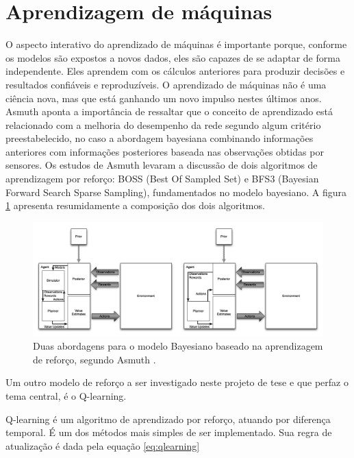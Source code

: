 \section{Aprendizagem de máquinas}
O aspecto interativo do aprendizado de máquinas é importante porque, conforme os modelos são expostos a novos dados, eles são capazes de se adaptar de forma independente. Eles aprendem com os cálculos anteriores para produzir decisões e resultados confiáveis e reproduzíveis. O aprendizado de máquinas não é uma ciência nova, mas que está ganhando um novo impulso nestes últimos anos. Asmuth \cite{asm:13} aponta a importância de ressaltar que o conceito de aprendizado está relacionado com a melhoria do desempenho da rede segundo algum critério preestabelecido, no caso a abordagem bayesiana combinando informações anteriores com informações posteriores baseada nas observações obtidas por sensores. Os estudos de Asmuth \cite{asm:13} levaram a discussão de dois algoritmos de aprendizagem por reforço: BOSS (Best Of Sampled Set) e BFS3 (Bayesian Forward Search Sparse Sampling), fundamentados no modelo bayesiano. A figura \ref{asmuth} apresenta resumidamente a composição dos dois algoritmos.
\begin{figure} [h!]												%
	\centering													%
	\includegraphics[width=1.0\textwidth]{./asmuth}				%
	\caption{Duas abordagens para o modelo Bayesiano baseado na aprendizagem de reforço, segundo Asmuth \cite{asm:13}.}			%
	\label{asmuth}												%
\end{figure}													%

Um outro modelo de reforço a ser investigado neste projeto de tese e que perfaz o tema central, é o Q-learning.

Q-learning é um algoritmo de aprendizado por reforço, atuando por diferença temporal. É um dos métodos mais simples de ser implementado. Sua regra de atualização é dada pela equação \ref{eq:qlearning}

